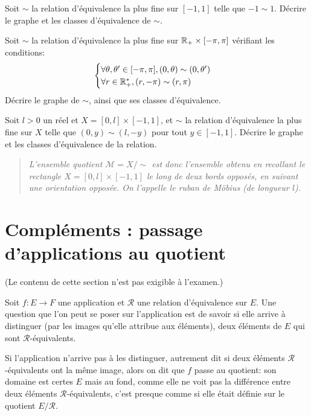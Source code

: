 \begin{exercice}
Soit $\sim$  la relation d'équivalence la plus fine sur $[-1,1]$ telle que  $-1\sim  1$. Décrire le graphe et les classes d'équivalence de $\sim$.
\end{exercice}

\begin{exercice}\label{exo-coord-polaires-graphe}
Soit $\sim$ la relation d'équivalence la plus fine sur $\mathbb{R}_+\times [-\pi,\pi]$ vérifiant les conditions: 
\[
\begin{cases}
\forall \theta,\theta'\in [-\pi,\pi], (0,\theta)\sim (0,\theta')\\
\forall r\in \mathbb{R}_+^*, (r,-\pi)\sim (r,\pi)
\end{cases}
\]
Décrire le graphe de $\sim$, ainsi que ses classes d'équivalence.
\end{exercice}

\begin{exercice}
Soit $l>0$ un réel et $X=[0,l]\times [-1,1]$, et $\sim$ la relation d'équivalence la plus fine sur $X$ telle que $(0,y)\sim(l,-y)$ pour tout $y\in [-1,1]$.  Décrire le graphe et les classes d'équivalence de la relation.

\begin{quote}\emph{
L'ensemble quotient $\mathcal M = X/\sim$ est donc l'ensemble obtenu en recollant le rectangle $X=[0,l]\times [-1,1]$ le long de deux bords opposés, en suivant une orientation opposée. On l'appelle le \emph{ruban de Möbius} (de longueur $l$).}
\end{quote}
\end{exercice}









\section{Compléments : passage d'applications au quotient}

(Le contenu de cette section n'est pas exigible à l'examen.)

\begin{mdframed}[linewidth=2]
Soit $f : E\to F$ une application et $\mathcal R$ une relation d'équivalence sur $E$. Une question que l'on peut se poser sur l'application est de savoir si elle arrive à distinguer (par les images qu'elle attribue aux éléments), deux éléments de $E$ qui sont $\mathcal R$-équivalents.

Si l'application n'arrive pas à les distinguer, autrement dit si deux éléments $\mathcal R$-équivalents ont la même image, alors on dit que $f$ \og passe au quotient\fg : son domaine est certes $E$ mais au fond, comme elle ne voit pas la différence entre deux éléments $\mathcal R$-équivalents, c'est presque comme si elle était définie sur le quotient $E/\mathcal R$.
\end{mdframed}


